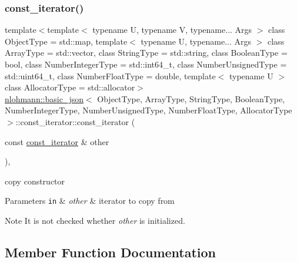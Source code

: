 \subsubsection{\texorpdfstring{const\+\_\+iterator()}{const\_iterator()}\hspace{0.1cm}{\footnotesize\ttfamily [3/3]}}
{\footnotesize\ttfamily template$<$template$<$ typename U, typename V, typename... Args $>$ class Object\+Type = std\+::map, template$<$ typename U, typename... Args $>$ class Array\+Type = std\+::vector, class String\+Type  = std\+::string, class Boolean\+Type  = bool, class Number\+Integer\+Type  = std\+::int64\+\_\+t, class Number\+Unsigned\+Type  = std\+::uint64\+\_\+t, class Number\+Float\+Type  = double, template$<$ typename U $>$ class Allocator\+Type = std\+::allocator$>$ \\
\hyperlink{classnlohmann_1_1basic__json}{nlohmann\+::basic\+\_\+json}$<$ Object\+Type, Array\+Type, String\+Type, Boolean\+Type, Number\+Integer\+Type, Number\+Unsigned\+Type, Number\+Float\+Type, Allocator\+Type $>$\+::const\+\_\+iterator\+::const\+\_\+iterator (\begin{DoxyParamCaption}\item[{const \hyperlink{classnlohmann_1_1basic__json_1_1const__iterator}{const\+\_\+iterator} \&}]{other }\end{DoxyParamCaption})\hspace{0.3cm}{\ttfamily [inline]}, {\ttfamily [noexcept]}}



copy constructor 


\begin{DoxyParams}[1]{Parameters}
\mbox{\tt in}  & {\em other} & iterator to copy from \\
\hline
\end{DoxyParams}
\begin{DoxyNote}{Note}
It is not checked whether {\itshape other} is initialized. 
\end{DoxyNote}


\subsection{Member Function Documentation}
\mbox{\label{classnlohmann_1_1basic__json_1_1const__iterator_a0e717ab658d27f646a3c8602cac91d83}} 
